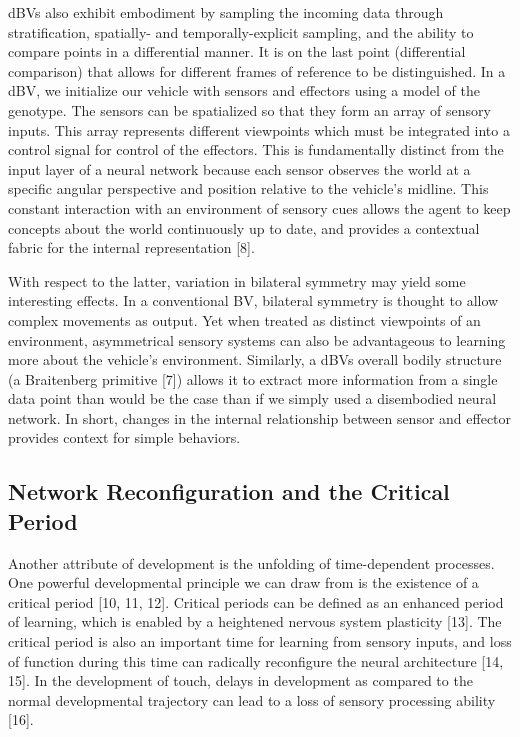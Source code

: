 \documentclass{article}
\begin{document}
dBVs also exhibit embodiment by sampling the incoming data through stratification, spatially- and temporally-explicit sampling, and the ability to compare points in a differential manner. It is on the last point (differential comparison) that allows for different frames of reference to be distinguished. In a dBV, we initialize our vehicle with sensors and effectors using a model of the genotype. The sensors can be spatialized so that they form an array of sensory inputs. This array represents different viewpoints which must be integrated into a control signal for control of the effectors. This is fundamentally distinct from the input layer of a neural network because each sensor observes the world at a specific angular perspective and position relative to the vehicle’s midline. This constant interaction with an environment of sensory cues allows the agent to keep concepts about the world continuously up to date, and provides a contextual fabric for the internal representation [8].

With respect to the latter, variation in bilateral symmetry may yield some interesting effects. In a conventional BV, bilateral symmetry is thought to allow complex movements as output. Yet when treated as distinct viewpoints of an environment, asymmetrical sensory systems can also be advantageous to learning more about the vehicle’s environment. Similarly, a dBVs overall bodily structure (a Braitenberg primitive [7]) allows it to extract more information from a single data point than would be the case than if we simply used a disembodied neural network. In short, changes in the internal relationship between sensor and effector provides context for simple behaviors.

\subsection{Network Reconfiguration and the Critical Period}

Another attribute of development is the unfolding of time-dependent processes. One powerful developmental principle we can draw from is the existence of a critical period [10, 11, 12]. Critical periods can be defined as an enhanced period of learning, which is enabled by a heightened nervous system plasticity [13]. The critical period is also an important time for learning from sensory inputs, and loss of function during this time can radically reconfigure the neural architecture [14, 15]. In the development of touch, delays in development as compared to the normal developmental trajectory can lead to a loss of sensory processing ability [16].
\end{document}
